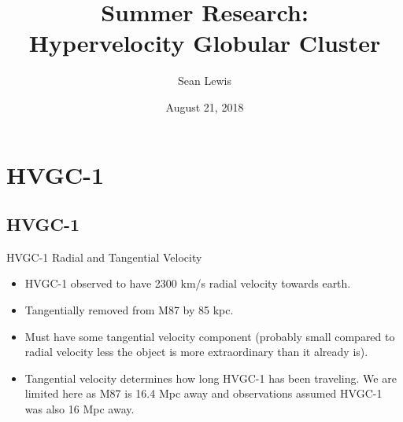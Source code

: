 \documentclass[aspectratio=169]{beamer}
\author[S.~Lewis]{Sean Lewis}
\date[2018-21-08]{August 21, 2018}
\title[Progress Report]{\Huge Summer Research: \\ Hypervelocity Globular Cluster}
\institute{Drexel University}
\begin{document}
\begin{frame}
  \maketitle
\end{frame}

\section{HVGC-1}
\subsection{HVGC-1}

\begin{frame}
  {HVGC-1 Radial and Tangential Velocity}
  \begin{itemize}
    \item HVGC-1 observed to have 2300 km/s radial velocity towards earth. 
    \item Tangentially removed from M87 by 85 kpc. 
    \item Must have some tangential velocity component (probably small compared to radial velocity less the object is more extraordinary than it already is).
    \item Tangential velocity determines how long HVGC-1 has been traveling. We are limited here as M87 is 16.4 Mpc away and observations assumed HVGC-1 was also 16 Mpc away.
  \end{itemize}
  
\end{frame}
\end{document}
